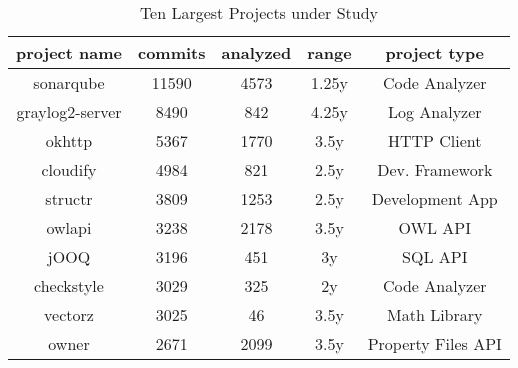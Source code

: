\begin{table}
	\caption{Ten Largest Projects under Study}
	\label{tableProjects}
	\centering
	\begin{tabular}{ | c | c | c | c | c | }
		\hline
		project name & commits & analyzed & range & project type \\
		\hline
		sonarqube & 11590 & 4573 & 1.25y & Code Analyzer \\
		graylog2-server & 8490 & 842 & 4.25y & Log Analyzer \\
		okhttp & 5367 & 1770 & 3.5y & HTTP Client \\
		cloudify & 4984 & 821 & 2.5y & Dev. Framework \\
		structr & 3809 & 1253 & 2.5y & Development App \\
		owlapi & 3238 & 2178 & 3.5y & OWL API \\
		jOOQ & 3196 & 451 & 3y & SQL API \\
		checkstyle & 3029 & 325 & 2y & Code Analyzer \\
		vectorz & 3025 & 46 & 3.5y & Math Library \\
		owner & 2671 & 2099 & 3.5y & Property Files API \\
		\hline
	\end{tabular}
\end{table}
